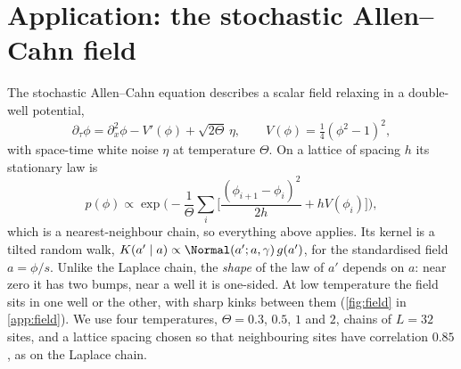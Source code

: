\section{Application: the stochastic Allen--Cahn field}
\label{sec:allen-cahn}

The stochastic Allen--Cahn equation \cite{allen1979microscopic,dapratozabczyk2014} describes a scalar field relaxing
in a double-well potential,
\begin{equation}
  \partial_\tau\phi=\partial_x^2\phi-V'(\phi)+\sqrt{2\Theta}\,\eta,\qquad V(\phi)=\tfrac14(\phi^2-1)^2,
\end{equation}
with space-time white noise $\eta$ at temperature $\Theta$. On a lattice of spacing $h$ its stationary law is
\begin{equation}
  p(\phi)\propto\exp\Big(-\frac1\Theta\sum_i\Big[\frac{(\phi_{i+1}-\phi_i)^2}{2h}+hV(\phi_i)\Big]\Big),
\end{equation}
which is a nearest-neighbour chain, so everything above applies. Its kernel is a tilted random walk,
$K(a'\mid a)\propto\Normal(a';a,\gamma)\,g(a')$, for the standardised field $a=\phi/s$. Unlike the Laplace chain, the
\emph{shape} of the law of $a'$ depends on $a$: near zero it has two bumps, near a well it is one-sided. At low
temperature the field sits in one well or the other, with sharp kinks between them (\cref{fig:field} in \cref{app:field}). We use four
temperatures, $\Theta=0.3$, $0.5$, $1$ and $2$, chains of $L=32$ sites, and a lattice spacing chosen so that
neighbouring sites have correlation $0.85$, as on the Laplace chain.

\begin{table}[t]
  \caption{Allen--Cahn field: relative score error divided by that of the best linear denoiser, from $N=2048$
  training sequences; mean over 16 seeds (8 for the neural energy kernel and the U-Net). The kernels are learned by EM
  from one noisy view per sequence. Best of four: a window CNN and a transformer, each trained by implicit and by
  denoising score matching on the same noisy views. Dashes: not run.}
  \label{tab:field}
  \centering
  \small
  \setlength{\tabcolsep}{3.5pt}
  
\end{table}

